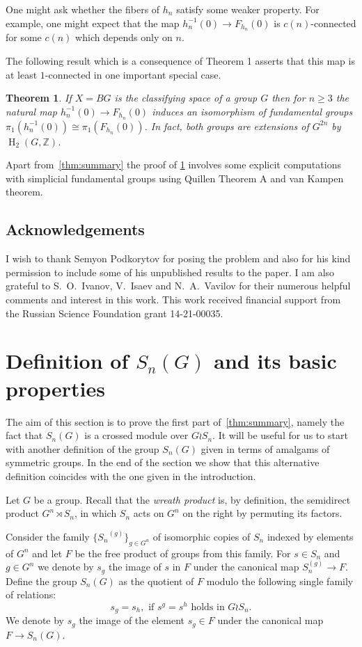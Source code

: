 \documentclass[oneside, 10pt]{amsart}
\theoremstyle{plain}
\newtheorem{thm}{Theorem}
\numberwithin{equation}{section}
\numberwithin{lemma}{section}
\theoremstyle{remark}
\theoremstyle{definition}
\DeclareMathOperator{\HH}{H}
\newcommand{\ZZ}{\mathbb{Z}}
\begin{document}
One might ask whether the fibers of $h_n$ satisfy some weaker property.
For example, one might expect that the map $h_n^{-1}(0) \to F_{h_n}(0)$ is $c(n)$-connected for some $c(n)$ which depends only on $n$. %
  
The following result which is a consequence of Theorem 1 asserts that this map is at least $1$-connected in one important special case.
\begin{thm} \label{thm:main} If $X=BG$ is the classifying space of a group $G$ then for $n\geq 3$
 the natural map $h_n^{-1}(0) \to F_{h_n}(0)$ induces an isomorphism of fundamental groups
 $\pi_1(h^{-1}_n(0))\cong \pi_1(F_{h_n}(0))$. 
 In fact, both groups are extensions of $G^{2n}$ by $\HH_2(G, \ZZ)$. \end{thm}
Apart from~\cref{thm:summary} the proof of \cref{thm:main} involves some explicit computations with simplicial fundamental groups 
 using Quillen Theorem A and van Kampen theorem.

\subsection{Acknowledgements}
I wish to thank Semyon Podkorytov for posing the problem and also for his kind permission to include some of his unpublished results to the paper.
I am also grateful to S.~O.~Ivanov, V.~Isaev and N.~A.~Vavilov for their numerous helpful comments and interest in this work.
This work received financial support from the Russian Science Foundation grant 14-21-00035.

\section{Definition of $S_n(G)$ and its basic properties} \label{sec:QnG-def}
The aim of this section is to prove the first part of~\cref{thm:summary}, namely the fact that $S_n(G)$ is a crossed module over $G \wr S_n$.
It will be useful for us to start with another definition of the group $S_n(G)$ given in terms of amalgams of symmetric groups.
In the end of the section we show that this alternative definition coincides with the one given in the introduction.

Let $G$ be a group. Recall that the {\it wreath product} is, by definition,
the semidirect product $G^n \rtimes S_n$, in which $S_n$ acts on $G^n$ on the right by permuting its factors.

Consider the family $\{{S_n}^{(g)}\}_{g\in G^n}$ of isomorphic copies of $S_n$ indexed by elements of $G^n$ and let $F$ be the free product of groups from this family.
For $s\in S_n$ and $g\in G^n$ we denote by 
$s_{g}$ the image of $s$ in $F$ under the canonical map $S_n^{(g)} \to F$.
Define the group $S_n(G)$ as the quotient of $F$ modulo the following single family of relations:
\begin{equation} \label{eq:main_rel} s_{g} = s_{h}, \text{ if $s^g = s^h$ holds in $G \wr S_n$.} \end{equation}
We denote by $s_g$ the image of the element $s_g\in F$ under the canonical map $F\to S_n(G)$.
\end{document}
